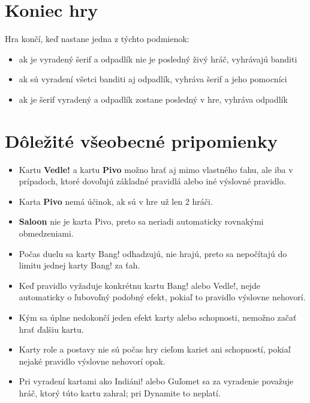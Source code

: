 \section*{Koniec hry}
Hra končí, keď nastane jedna z týchto podmienok:
\begin{itemize}
    \item ak je vyradený šerif a odpadlík nie je posledný živý hráč, vyhrávajú banditi
    \item ak sú vyradení všetci banditi aj odpadlík, vyhráva šerif a jeho pomocníci
    \item ak je šerif vyradený a odpadlík zostane posledný v hre, vyhráva odpadlík
\end{itemize}

\section*{Dôležité všeobecné pripomienky}
\begin{itemize}
    \item Kartu \textbf{Vedle!} a kartu \textbf{Pivo} možno hrať aj mimo vlastného ťahu, ale iba v prípadoch, ktoré dovoľujú základné pravidlá alebo iné výslovné pravidlo.
    \item Karta \textbf{Pivo} nemá účinok, ak sú v hre už len 2 hráči.
    \item \textbf{Saloon} nie je karta Pivo, preto sa neriadi automaticky rovnakými obmedzeniami.
    \item Počas duelu sa karty Bang! odhadzujú, nie hrajú, preto sa nepočítajú do limitu jednej karty Bang! za ťah.
    \item Keď pravidlo vyžaduje konkrétnu kartu Bang! alebo Vedle!, nejde automaticky o ľubovoľný podobný efekt, pokiaľ to pravidlo výslovne nehovorí.
    \item Kým sa úplne nedokončí jeden efekt karty alebo schopnosti, nemožno začať hrať ďalšiu kartu.
    \item Karty role a postavy nie sú počas hry cieľom kariet ani schopností, pokiaľ nejaké pravidlo výslovne nehovorí opak.
    \item Pri vyradení kartami ako Indiáni! alebo Guľomet sa za vyradenie považuje hráč, ktorý túto kartu zahral; pri Dynamite to neplatí.
\end{itemize}


